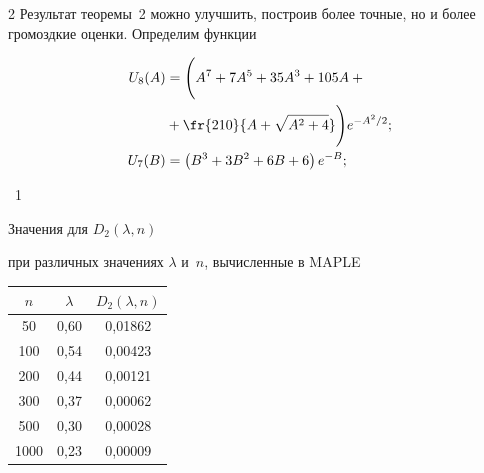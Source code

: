 \begin{multicols}{2}
Результат теоремы~2 можно улучшить, построив более точные, но и более громоздкие оценки. Определим функции


\begin{align*}


  U_8(A)&= \Bigg(A^7+7A^5+35A^3+ 105A + {}\\


&{}+\fr{210}{A+\sqrt{A^2+4}}\Bigg)e^{-A^2/2};\\


  U_7(B)&= \left(B^3+3B^2+6B+6\right)e^{-B};


\end{align*}








  \noindent


\begin{center} %


\parbox{56mm}{{\tablename~1}\ \ \small{Значения для $D_2(\lambda,n)$ 


при различных значениях  $\lambda$ и~$n$, вычисленные в    MAPLE}}







\vspace*{2ex}


\tabcolsep=14.6pt


{\small


\begin{tabular}{|c|c|c|}


\hline


$n$   & $\lambda$& $D_2(\lambda,n)$\\


\hline


\hphantom{9}50 &0,60 & 0,01862\\


100  & 0,54& 0,00423\\


200  & 0,44 & 0,00121\\


300&   0,37 & 0,00062\\


500&  0,30 & 0,00028\\


1000\hphantom{9} & 0,23 & 0,00009\\


\hline 



\end{tabular}}
\end{center}
\end{multicols}
